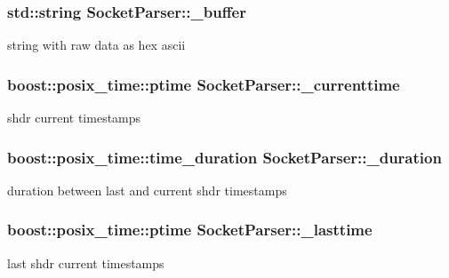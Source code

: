 \subsubsection[{\+\_\+buffer}]{\setlength{\rightskip}{0pt plus 5cm}std\+::string Socket\+Parser\+::\+\_\+buffer\hspace{0.3cm}{\ttfamily [protected]}}\label{class_socket_parser_ac7450e06ee955973ca119c23b4e561c7}
string with raw data as hex ascii \hypertarget{class_socket_parser_a2a4fdde47af625d6ecb471529b64a896}{}
\subsubsection[{\+\_\+currenttime}]{\setlength{\rightskip}{0pt plus 5cm}boost\+::posix\+\_\+time\+::ptime Socket\+Parser\+::\+\_\+currenttime\hspace{0.3cm}{\ttfamily [protected]}}\label{class_socket_parser_a2a4fdde47af625d6ecb471529b64a896}
shdr current timestamps \hypertarget{class_socket_parser_a2ad0ff35350e4a1624d895554902b7dd}{}
\subsubsection[{\+\_\+duration}]{\setlength{\rightskip}{0pt plus 5cm}boost\+::posix\+\_\+time\+::time\+\_\+duration Socket\+Parser\+::\+\_\+duration\hspace{0.3cm}{\ttfamily [protected]}}\label{class_socket_parser_a2ad0ff35350e4a1624d895554902b7dd}
duration between last and current shdr timestamps \hypertarget{class_socket_parser_ac6c26c2ff2af1aae99641a00ee5ffe59}{}
\subsubsection[{\+\_\+lasttime}]{\setlength{\rightskip}{0pt plus 5cm}boost\+::posix\+\_\+time\+::ptime Socket\+Parser\+::\+\_\+lasttime\hspace{0.3cm}{\ttfamily [protected]}}\label{class_socket_parser_ac6c26c2ff2af1aae99641a00ee5ffe59}
last shdr current timestamps \hypertarget{class_socket_parser_afd07458ad5df143cfe01dde2f3669272}{}
